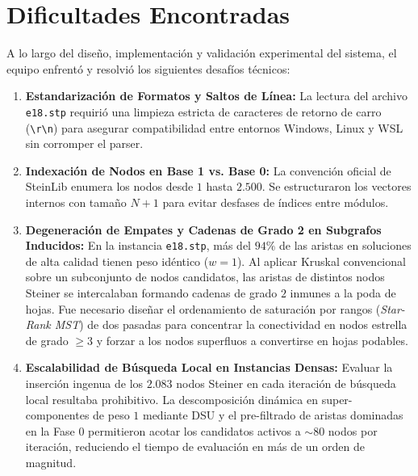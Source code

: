 \documentclass[11pt,a4paper]{article}
\begin{document}
\section{Dificultades Encontradas}
\label{sec:dificultades}

A lo largo del diseño, implementación y validación experimental del sistema, el equipo enfrentó y resolvió los siguientes desafíos técnicos:
\begin{enumerate}
    \item \textbf{Estandarización de Formatos y Saltos de Línea:} La lectura del archivo \texttt{e18.stp} requirió una limpieza estricta de caracteres de retorno de carro (\texttt{\textbackslash r\textbackslash n}) para asegurar compatibilidad entre entornos Windows, Linux y WSL sin corromper el parser.
    \item \textbf{Indexación de Nodos en Base 1 vs. Base 0:} La convención oficial de SteinLib enumera los nodos desde $1$ hasta $2.500$. Se estructuraron los vectores internos con tamaño $N + 1$ para evitar desfases de índices entre módulos.
    \item \textbf{ Degeneración de Empates y Cadenas de Grado 2 en Subgrafos Inducidos:} En la instancia \texttt{e18.stp}, más del $94\%$ de las aristas en soluciones de alta calidad tienen peso idéntico ($w = 1$). Al aplicar Kruskal convencional sobre un subconjunto de nodos candidatos, las aristas de distintos nodos Steiner se intercalaban formando cadenas de grado $2$ inmunes a la poda de hojas. Fue necesario diseñar el ordenamiento de saturación por rangos (\textit{Star-Rank MST}) de dos pasadas para concentrar la conectividad en nodos estrella de grado $\ge 3$ y forzar a los nodos superfluos a convertirse en hojas podables.
    \item \textbf{Escalabilidad de Búsqueda Local en Instancias Densas:} Evaluar la inserción ingenua de los $2.083$ nodos Steiner en cada iteración de búsqueda local resultaba prohibitivo. La descomposición dinámica en super-componentes de peso $1$ mediante DSU y el pre-filtrado de aristas dominadas en la Fase 0 permitieron acotar los candidatos activos a $\sim 80$ nodos por iteración, reduciendo el tiempo de evaluación en más de un orden de magnitud.
\end{enumerate}

\end{document}
